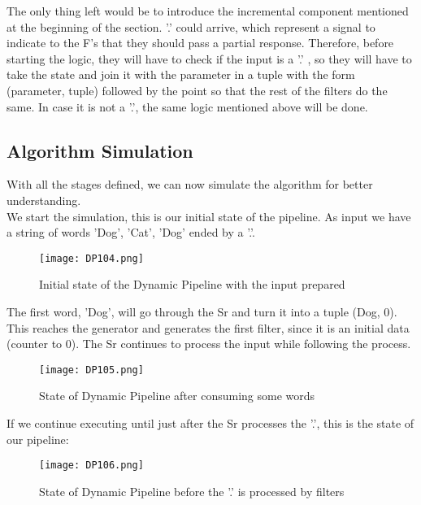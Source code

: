The only thing left would be to introduce the incremental component mentioned at the beginning of the section.
'.' could arrive, which represent a signal to indicate to the F's that they should pass a partial response.
Therefore, before starting the logic, they will have to check if the input is a '.' , so they will have to take the state and join it with the parameter in a tuple with the form (parameter, tuple) followed by the point so that the rest of the filters do the same. In case it is not a '.', the same logic mentioned above will be done.

\subsection{Algorithm Simulation}
With all the stages defined, we can now simulate the algorithm for better understanding. \\

We start the simulation, this is our initial state of the pipeline.
As input we have a string of words 'Dog', 'Cat', 'Dog' ended by a '.'.

\begin{figure}[H]
    \centering
    \texttt{[image: DP104.png]}
    \caption[{[Lib]} Counting words inital state]{Initial state of the Dynamic Pipeline with the input prepared}
    \label{fig:DP104}
\end{figure}

The first word, 'Dog', will go through the Sr and turn it into a tuple (Dog, 0).
This reaches the generator and generates the first filter, since it is an initial data (counter to 0).
The Sr continues to process the input while following the process.

\begin{figure}[H]
    \centering
    \texttt{[image: DP105.png]}
    \caption[{[Lib]} Counting words state 1]{State of Dynamic Pipeline after consuming some words}
    \label{fig:DP105}
\end{figure}

If we continue executing until just after the Sr processes the '.', this is the state of our pipeline:

\begin{figure}[H]
    \centering
    \texttt{[image: DP106.png]}
    \caption[{[Lib]} Counting words state 2]{State of Dynamic Pipeline before the '.' is processed by filters}
    \label{fig:DP106}
\end{figure}

